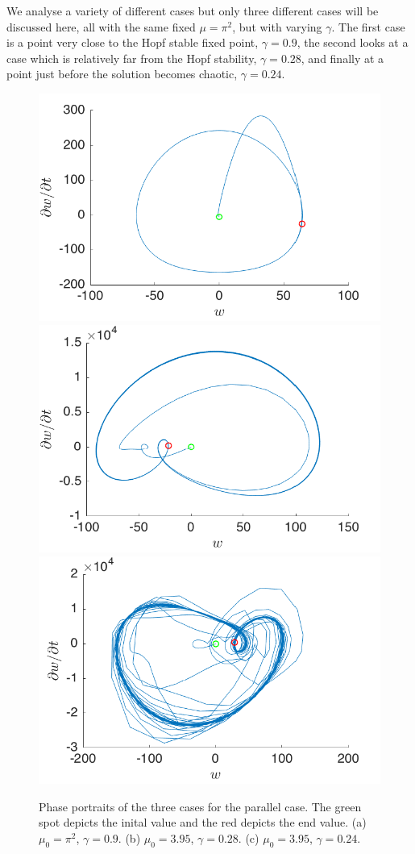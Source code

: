 \documentclass[11pt]{article}
\begin{document}
We analyse a variety of different cases but only three different cases will be discussed here, all with the same fixed $\mu = \pi^2$, but with varying $\gamma$. The first case is a point very close to the Hopf stable fixed point, $\gamma = 0.9$, the second looks at a case which is relatively far from the Hopf stability, $\gamma = 0.28$, and finally at a point just before the solution becomes chaotic, $\gamma = 0.24$.  

\begin{figure}[!h]
    \centering
    \includegraphics[width=.3\linewidth]{PhasePg09.png}
    \hfill
    \includegraphics[width=.3\linewidth]{PhasePg028.png}
    \hfill
    \includegraphics[width=.3\linewidth]{PhasePg024.png}

    \caption{%
        Phase portraits of the three cases for the parallel case. The green spot depicts the inital value and the red depicts the end value.
        (a)  $\mu_0 = \pi^2$, $\gamma = 0.9$.
        (b)  $\mu_0 = 3.95$, $\gamma = 0.28$.
        (c)  $\mu_0 = 3.95$, $\gamma = 0.24$.%
    }
    \label{fig:parallelPhase}
\end{figure}
\end{document}
